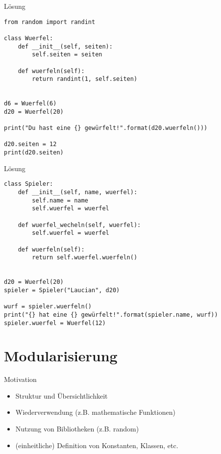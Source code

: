 \begin{frame}[fragile]{Lösung}
    \begin{lstlisting}
from random import randint

class Wuerfel:
    def __init__(self, seiten):
        self.seiten = seiten

    def wuerfeln(self):
        return randint(1, self.seiten)


d6 = Wuerfel(6)
d20 = Wuerfel(20)

print("Du hast eine {} gewürfelt!".format(d20.wuerfeln()))

d20.seiten = 12
print(d20.seiten)
    \end{lstlisting}
\end{frame}


\begin{frame}[fragile]{Lösung}
	\begin{lstlisting}
class Spieler:
    def __init__(self, name, wuerfel):
        self.name = name
        self.wuerfel = wuerfel

    def wuerfel_wecheln(self, wuerfel):
        self.wuerfel = wuerfel

    def wuerfeln(self):
        return self.wuerfel.wuerfeln()


d20 = Wuerfel(20)
spieler = Spieler("Laucian", d20)

wurf = spieler.wuerfeln()
print("{} hat eine {} gewürfelt!".format(spieler.name, wurf))
spieler.wuerfel = Wuerfel(12)
	\end{lstlisting}
\end{frame}


\section{Modularisierung}

\begin{frame}{Motivation}
	\begin{itemize}
		\item Struktur und Übersichtlichkeit 
		\item Wiederverwendung (z.B. mathematische Funktionen)
		\item Nutzung von Bibliotheken (z.B. random)
		\item (einheitliche) Definition von Konstanten, Klassen, etc.
	\end{itemize}
\end{frame}


